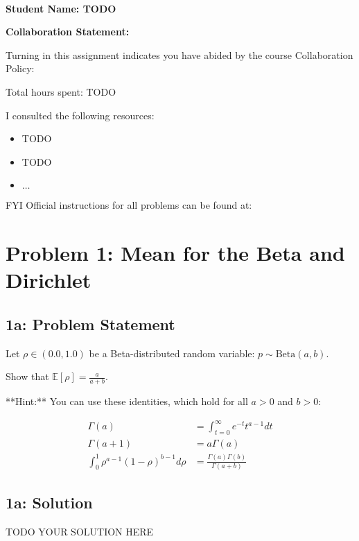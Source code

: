 \documentclass[12pt]{article}
\newcommand{\officialdirections}[1]{{\color{blue} #1}}
\begin{document}
~~\\ %

{\Large{\bf Student Name: TODO}}

{\Large{\bf Collaboration Statement:}}

Turning in this assignment indicates you have abided by the course Collaboration Policy:


Total hours spent: TODO

I consulted the following resources:
\begin{itemize}
\item TODO
\item TODO
\item $\ldots$	
\end{itemize}

FYI Official instructions for all problems can be found at:


\tableofcontents

\newpage
\section*{Problem 1: Mean for the Beta and Dirichlet}

\officialdirections{
\subsection*{1a: Problem Statement}

Let $\rho \in (0.0, 1.0)$ be a Beta-distributed random variable: $p \sim \text{Beta}(a, b)$. 

Show that $\mathbb{E}[ \rho ] = \frac{a}{a + b}$.

**Hint:** You can use these identities, which hold for all $a > 0$ and $b > 0$:

\begin{align}
\Gamma(a) &= \int_{t=0}^{\infty} e^{-t} t^{a-1} dt
\\
\Gamma(a+1) &= a \Gamma(a)
\\
\int_{0}^1 \rho^{a-1} (1-\rho)^{b-1} d\rho &= \frac{\Gamma(a)\Gamma(b)}{\Gamma(a+b)}
\end{align}
}

\subsection{1a: Solution}
TODO YOUR SOLUTION HERE
\end{document}
